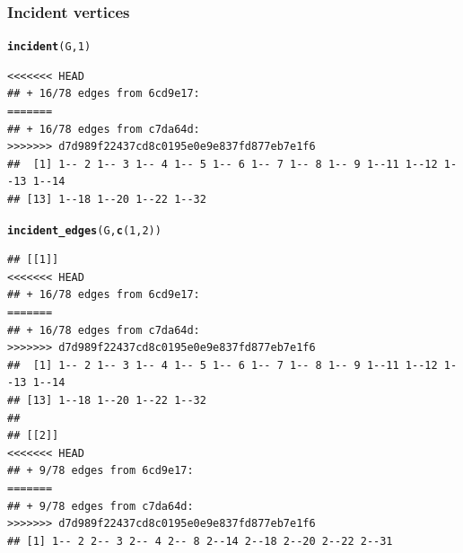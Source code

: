 \documentclass[aspectratio=169]{beamer}\usepackage[]{graphicx}\usepackage[]{xcolor}
\makeatletter
\newcommand{\hlnum}[1]{\textcolor[rgb]{0.686,0.059,0.569}{#1}}%
\newcommand{\hldef}[1]{\textcolor[rgb]{0.345,0.345,0.345}{#1}}%
\newcommand{\hlkwd}[1]{\textcolor[rgb]{0.737,0.353,0.396}{\textbf{#1}}}%
\newenvironment{kframe}{%
 \def\at@end@of@kframe{}%
 \ifinner\ifhmode%
  \def\at@end@of@kframe{\end{minipage}}%
  \begin{minipage}{\columnwidth}%
 \fi\fi%
 \def\FrameCommand##1{\hskip\@totalleftmargin \hskip-\fboxsep
 \colorbox{shadecolor}{##1}\hskip-\fboxsep
     \hskip-\linewidth \hskip-\@totalleftmargin \hskip\columnwidth}%
 \MakeFramed {\advance\hsize-\width
   \@totalleftmargin\z@ \linewidth\hsize
   \@setminipage}}%
 {\par\unskip\endMakeFramed%
 \at@end@of@kframe}
\newenvironment{knitrout}{}{} %
\makeatother
\begin{document}
\begin{frame}[fragile]\frametitle{Incident vertices}
\begin{knitrout}
\color{fgcolor}\begin{kframe}
\begin{alltt}
\hlkwd{incident}\hldef{(G,} \hlnum{1}\hldef{)}
\end{alltt}
\begin{verbatim}
<<<<<<< HEAD
## + 16/78 edges from 6cd9e17:
=======
## + 16/78 edges from c7da64d:
>>>>>>> d7d989f22437cd8c0195e0e9e837fd877eb7e1f6
##  [1] 1-- 2 1-- 3 1-- 4 1-- 5 1-- 6 1-- 7 1-- 8 1-- 9 1--11 1--12 1--13 1--14
## [13] 1--18 1--20 1--22 1--32
\end{verbatim}
\begin{alltt}
\hlkwd{incident_edges}\hldef{(G,} \hlkwd{c}\hldef{(}\hlnum{1}\hldef{,} \hlnum{2}\hldef{))}
\end{alltt}
\begin{verbatim}
## [[1]]
<<<<<<< HEAD
## + 16/78 edges from 6cd9e17:
=======
## + 16/78 edges from c7da64d:
>>>>>>> d7d989f22437cd8c0195e0e9e837fd877eb7e1f6
##  [1] 1-- 2 1-- 3 1-- 4 1-- 5 1-- 6 1-- 7 1-- 8 1-- 9 1--11 1--12 1--13 1--14
## [13] 1--18 1--20 1--22 1--32
## 
## [[2]]
<<<<<<< HEAD
## + 9/78 edges from 6cd9e17:
=======
## + 9/78 edges from c7da64d:
>>>>>>> d7d989f22437cd8c0195e0e9e837fd877eb7e1f6
## [1] 1-- 2 2-- 3 2-- 4 2-- 8 2--14 2--18 2--20 2--22 2--31
\end{verbatim}
\end{kframe}
\end{knitrout}
\end{frame}
\end{document}
